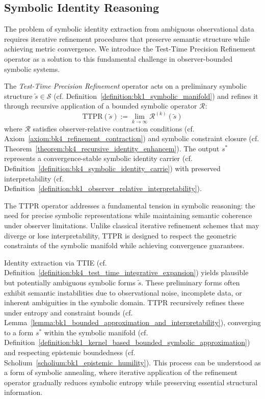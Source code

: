 \subsection{Symbolic Identity Reasoning}
\label{subsec:bk4_symbolic_identity_reasoning}

The problem of symbolic identity extraction from ambiguous observational data requires iterative refinement procedures that preserve semantic structure while achieving metric convergence. We introduce the Test-Time Precision Refinement operator as a solution to this fundamental challenge in observer-bounded symbolic systems.

\begin{definition}
\label{definition:bk4_test_time_precision_refinement}
The \emph{Test-Time Precision Refinement} operator acts on a preliminary symbolic structure $\tilde{s} \in \mathcal{S}$ (cf. Definition~\ref{definition:bk1_symbolic_manifold}) and refines it through recursive application of a bounded symbolic operator $\mathcal{R}$:
\[
\mathrm{TTPR}(\tilde{s}) := \lim_{k \to \infty} \mathcal{R}^{(k)}(\tilde{s})
\]
where $\mathcal{R}$ satisfies observer-relative contraction conditions (cf. Axiom~\ref{axiom:bk4_refinement_contraction}) and symbolic constraint closure (cf. Theorem~\ref{theorem:bk4_recursive_identity_enhancem}). The output $s^*$ represents a convergence-stable symbolic identity carrier (cf. Definition~\ref{definition:bk4_symbolic_identity_carrie}) with preserved interpretability (cf. Definition~\ref{definition:bk1_observer_relative_interpretability}).
\end{definition}

The TTPR operator addresses a fundamental tension in symbolic reasoning: the need for precise symbolic representations while maintaining semantic coherence under observer limitations. Unlike classical iterative refinement schemes that may diverge or lose interpretability, TTPR is designed to respect the geometric constraints of the symbolic manifold while achieving convergence guarantees.

\begin{remark}
Identity extraction via TTIE (cf. Definition~\ref{definition:bk4_test_time_integrative_expansion}) yields plausible but potentially ambiguous symbolic forms $\tilde{s}$. These preliminary forms often exhibit semantic instabilities due to observational noise, incomplete data, or inherent ambiguities in the symbolic domain. TTPR recursively refines these under entropy and constraint bounds (cf. Lemma~\ref{lemma:bk1_bounded_approximation_and_interpretability}), converging to a form $s^*$ within the symbolic manifold (cf. Definition~\ref{definition:bk1_kernel_based_bounded_symbolic_approximation}) and respecting epistemic boundedness (cf. Scholium~\ref{scholium:bk1_epistemic_humility}). This process can be understood as a form of symbolic annealing, where iterative application of the refinement operator gradually reduces symbolic entropy while preserving essential structural information.
\end{remark}

